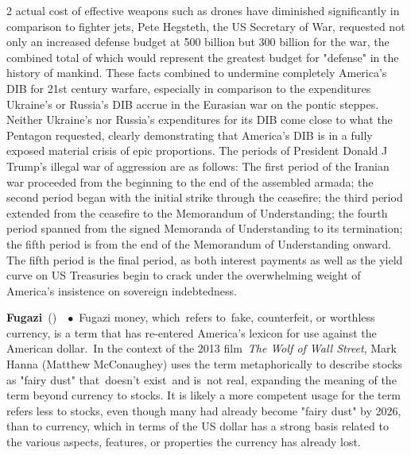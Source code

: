 \documentclass[10pt,a4paper,twoside]{article} %
\newcommand{\entry}[4]{\markboth{#1}{#1}\textbf{#1}\ {(#2)}\ \textit{#3}\ $\bullet$\ {#4}}  %
\begin{document}
\begin{multicols}{2}
{actual cost of effective weapons such as drones have diminished significantly in comparison to fighter jets, Pete Hegsteth, the US Secretary of War, requested not only an increased defense budget at 500 billion but 300 billion for the war, the combined total of which would represent the greatest budget for "defense" in the history of mankind. These facts combined to undermine completely America's DIB for 21st century warfare, especially in comparison to the expenditures Ukraine's or Russia's DIB accrue in the Eurasian war on the pontic steppes. Neither Ukraine's nor Russia's expenditures for its DIB come close to what the Pentagon requested, clearly demonstrating that America's DIB is in a fully exposed material crisis of epic proportions. \newline \indent The periods of President Donald J Trump's illegal war of aggression are as follows: The first period of the Iranian war proceeded from the beginning to the end of the assembled armada; the second period began with the initial strike through the ceasefire; the third period extended from the ceasefire to the Memorandum of Understanding; the fourth period spanned from the signed Memoranda of Understanding to its termination; the fifth period is from the end of the Memorandum of Understanding onward. The fifth period is the final period, as both interest payments as well as the yield curve on US Treasuries begin to crack under the overwhelming weight of America's insistence on sovereign indebtedness.}

\entry{Fugazi} {} {} {Fugazi money, which refers to fake, counterfeit, or worthless currency, is a term that has re-entered America's lexicon for use against the American dollar. In the context of the 2013 film \emph{The Wolf of Wall Street}, Mark Hanna (Matthew McConaughey) uses the term metaphorically to describe stocks as "fairy dust" that doesn't exist and is not real, expanding the meaning of the term beyond currency to stocks. It is likely a more competent usage for the term refers less to stocks, even though many had already become "fairy dust" by 2026, than to currency, which in terms of the US dollar has a strong basis related to the various aspects, features, or properties the currency has already lost.}


\end{multicols}

\end{document}
